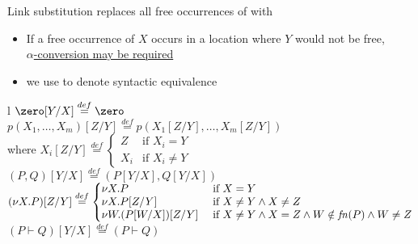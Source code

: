 \begin{frame}{Link substitution}
  \footnotesize
   replaces all free occurrences of  with 
  \begin{itemize}
  \item
    If a free occurrence of $X$ occurs in a location where $Y$ would not be free,\\
    \underline{$\alpha$-conversion may be required}
  \item    
    we use \mfbox{=} to denote syntactic equivalence
  \end{itemize}
  
  \begin{center}
    \begin{tabular}{l}
      \( \zero[Y/X] \overset{def}{=} \zero \) \vspace{0.5em}\\ 
      \( p(X_1, \ldots, X_m)[Z/Y] \overset{def}{=} p(X_1[Z/Y], \ldots, X_m[Z/Y]) \)
      \vspace{0.3em}\\
      \hspace{11em} where \(
      X_i[Z/Y] \overset{def}{=}
      \left\{
      \begin{array}{ll}
        Z   & \mbox{if } X_i = Y \\
        X_i & \mbox{if } X_i \neq Y
      \end{array}
      \right.
      \) \vspace{0.5em}\\ 
      \((P, Q)[Y/X] \overset{def}{=} (P[Y/X], Q[Y/X])\) \vspace{0.5em}\\
      \(
      (\nu X.P)[Z/Y] \overset{def}{=}
      \left\{
      \arraycolsep = 0pt
      \begin{array}{ll}
        \nu X.P & \mbox{\hspace{1em} if } X = Y \\
        \nu X.P[Z/Y] & \mbox{\hspace{1em} if } X \neq Y \land X \neq Z \\
        \nu W.(P[W/X])[Z/Y] & \mbox{\hspace{1em} if }
        X \neq Y \land X = Z
        \land W \notin \mathit{fn}(P) \land W \neq Z
      \end{array}
      \right.
      \) \vspace{0.5em}\\
      \( (P \vdash Q)[Y/X] \overset{def}{=} (P \vdash Q) \) \\
    \end{tabular}
  \end{center}
  
\end{frame}


